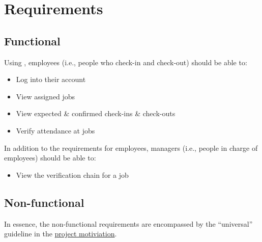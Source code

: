 \section{Requirements} \label{s:requirements}

\subsection{Functional}

Using \projectname{}, employees (i.e., people who \gls{check-in} and
\gls{check-out}) should be able to:

\begin{itemize}
  \item Log into their account
  \item View assigned jobs
  \item View expected \& confirmed check-ins \&
        check-outs
  \item Verify attendance at jobs
\end{itemize}

In addition to the requirements for employees, managers
(i.e., people in charge of employees) should be able to:

\begin{itemize}
  \item View the verification chain for a job
\end{itemize}

\subsection{Non-functional}

In essence, the non-functional requirements are encompassed
by the \enquote{universal} guideline in the
\hyperref[s:motivation]{project motiviation}.
